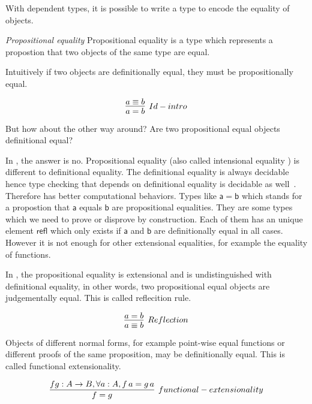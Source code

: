 With dependent types, it is possible to write a type to encode the equality of objects.

\begin{definition}
\textit{Propositional equality} Propositional equality is a type which represents a propostion that two objects of the same type are equal.
\end{definition}

Intuitively if two objects are definitionally equal, they must be propositionally equal.

\begin{equation*}
\infer[Id-intro]{a = b}{a \equiv b}
\end{equation*}

But how about the other way around? Are two propositional equal objects definitional equal?


In \itt, the answer is no. Propositional equality (also called intensional equality  \cite{nor:90}) is different to definitional equality. 
The definitional equality is always decidable hence type checking that depends on definitional equality is
decidable as well~\cite{alti:lics99}. Therefore \itt has better computational behaviors.
Types like $\mathsf{a = b}$ which stands for a
propostion that $\mathsf{a}$ equals $\mathsf{b}$ are propositional equalities. They are some types which we need to prove
or disprove by construction. Each of them has an unique element $\mathsf{refl}$ which only exists if $\mathsf{a}$ and $\mathsf{b}$ are
definitionally equal in all cases. However it is not enough for other extensional equalities, for example the equality of functions.


In \ett, the propositional equality is extensional and is undistinguished with definitional equality, in other words, two propositional equal objects are judgementally equal. This is called reflecition rule.

\begin{equation}
\label{reflection}
\infer[Reflection]{a \equiv b}{a = b}
\end{equation}

Objects of different normal forms, for example point-wise equal functions or different proofs of the same proposition, may be definitionally equal. This is called functional extensionality.

\begin{equation}
\label{fun-ext}
\infer[functional-extensionality]{f = g}{f g : A \rightarrow B, \forall a : A, f \, a = g \, a}
\end{equation}

